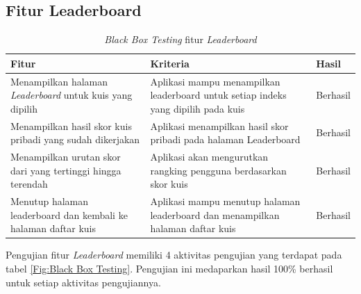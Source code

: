 \subsection{Fitur Leaderboard}
\begin{table}[H]
	\caption{\textit{Black Box Testing} fitur \textit{Leaderboard}}
	\label{Tab:blackBoxLead}
	\begin{tabular}{|p{}|p{}|p{}|}
		\hline
		 \centering\textbf{Fitur} & \multicolumn{1}{m{0.45\textwidth}|}{\centering \textbf{Kriteria}}&  \multicolumn{1}{m{0.1\textwidth}|}{\centering \textbf{Hasil}}\\
		\hline
		Menampilkan halaman \textit{Leaderboard} untuk kuis yang dipilih
		&Aplikasi mampu menampilkan leaderboard untuk setiap indeks yang dipilih pada kuis 
		& Berhasil\\
		\hline
		Menampilkan hasil skor kuis pribadi yang sudah dikerjakan
		& Aplikasi menampilkan hasil skor pribadi pada halaman Leaderboard
		& Berhasil\\
		\hline
		Menampilkan urutan skor dari yang tertinggi hingga terendah
		& Aplikasi akan mengurutkan rangking pengguna berdasarkan skor kuis 
		& Berhasil\\
		\hline
		Menutup halaman leaderboard dan kembali ke halaman daftar kuis
		& Aplikasi mampu menutup halaman leaderboard dan menampilkan halaman daftar kuis
		& Berhasil\\
		\hline
	\end{tabular}
\end{table}
Pengujian fitur \textit{Leaderboard} memiliki 4 aktivitas pengujian yang terdapat pada tabel \ref*{Fig:Black Box Testing}.
Pengujian ini medaparkan hasil 100\% berhasil untuk setiap aktivitas pengujiannya.
